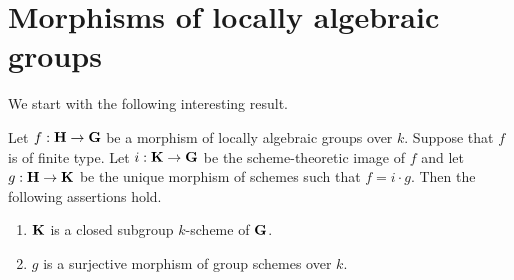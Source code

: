 \section{Morphisms of locally algebraic groups}
\noindent
We start with the following interesting result.

\begin{theorem}\label{theorem:images_of_locally_algebraic_groups_homomorphisms}
Let $f:\mathbf{H}\rightarrow \mathbf{G}$ be a morphism of locally algebraic groups over $k$. Suppose that $f$ is of finite type. Let $i:\mathbf{K}\rightarrow \mathbf{G}$ be the scheme-theoretic image of $f$ and let $g:\mathbf{H}\rightarrow \mathbf{K}$ be the unique morphism of schemes such that $f = i\cdot g$. Then the following assertions hold.
\begin{enumerate}[label=\emph{\textbf{(\arabic*)}}, leftmargin=3.0em]
\item $\mathbf{K}$ is a closed subgroup $k$-scheme of $\mathbf{G}$.
\item $g$ is a surjective morphism of group schemes over $k$.
\end{enumerate}
\end{theorem}
